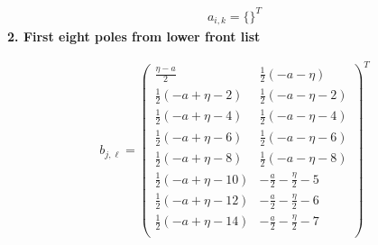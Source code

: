 \documentclass[11pt]{article}
\begin{document}
\begin{align*}
  a_{i,k} = 
  \{\}^T 
\end{align*}
\noindent\textbf{2. First eight poles from lower front list}

\begin{align*}
  b_{j,\ell} = 
  \left(
\begin{array}{cc}
 \frac{\eta -a}{2} & \frac{1}{2} (-a-\eta ) \\
 \frac{1}{2} (-a+\eta -2) & \frac{1}{2} (-a-\eta -2) \\
 \frac{1}{2} (-a+\eta -4) & \frac{1}{2} (-a-\eta -4) \\
 \frac{1}{2} (-a+\eta -6) & \frac{1}{2} (-a-\eta -6) \\
 \frac{1}{2} (-a+\eta -8) & \frac{1}{2} (-a-\eta -8) \\
 \frac{1}{2} (-a+\eta -10) & -\frac{a}{2}-\frac{\eta }{2}-5 \\
 \frac{1}{2} (-a+\eta -12) & -\frac{a}{2}-\frac{\eta }{2}-6 \\
 \frac{1}{2} (-a+\eta -14) & -\frac{a}{2}-\frac{\eta }{2}-7 \\
\end{array}
\right)^T 
\end{align*}

\printbibliography[title={References}]
\end{document}
